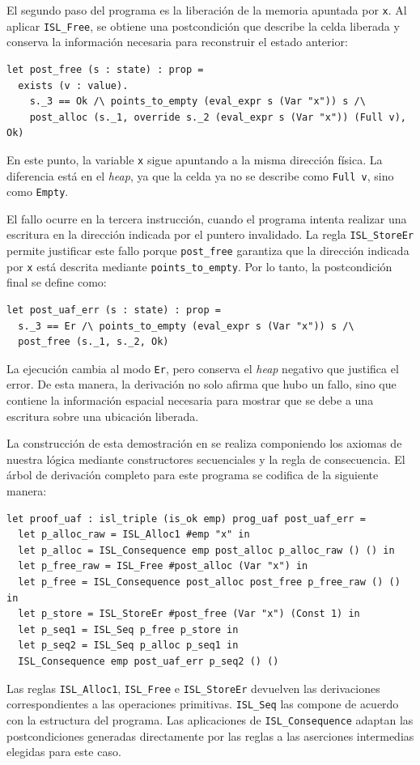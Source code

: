\documentclass[a4paper,	11pt]{report}
\newif\ifdraft\drafttrue
\newcommand{\comm}[3]{\ifdraft{{\color{#1}[#2: #3]}}\fi}
\newcommand{\guido}[1]{\comm{blue}{Guido}{#1}}
\begin{document}
El segundo paso del programa es la liberación de la memoria apuntada por \lstinline|x|.
Al aplicar \lstinline|ISL_Free|,
se obtiene una postcondición que describe la celda liberada y conserva la información necesaria para reconstruir el estado anterior:

\begin{lstlisting}
let post_free (s : state) : prop =
  exists (v : value).
    s._3 == Ok /\ points_to_empty (eval_expr s (Var "x")) s /\
    post_alloc (s._1, override s._2 (eval_expr s (Var "x")) (Full v), Ok)
\end{lstlisting}
En este punto,
la variable \lstinline|x| sigue apuntando a la misma dirección física.
La diferencia está en el \emph{heap}, ya que la celda ya no se describe como \lstinline|Full v|, sino como \lstinline|Empty|.

El fallo ocurre en la tercera instrucción,
cuando el programa intenta realizar una escritura en la dirección indicada por el puntero invalidado.
La regla \lstinline|ISL_StoreEr| permite justificar este fallo porque \lstinline|post_free| garantiza
que la dirección indicada por \lstinline|x| está descrita mediante \lstinline|points_to_empty|.
Por lo tanto,
la postcondición final se define como:

\begin{lstlisting}
let post_uaf_err (s : state) : prop =
  s._3 == Er /\ points_to_empty (eval_expr s (Var "x")) s /\
  post_free (s._1, s._2, Ok)
\end{lstlisting}
La ejecución cambia al modo \lstinline|Er|,
pero conserva el \emph{heap} negativo que justifica el error.
De esta manera,
la derivación no solo afirma que hubo un fallo,
sino que contiene la información espacial necesaria para mostrar que se debe a una escritura sobre una ubicación liberada.

La construcción de esta demostración en \fstar{} se realiza componiendo los axiomas de nuestra lógica
mediante constructores secuenciales y la regla de consecuencia.
El árbol de derivación completo para este programa se codifica de la siguiente manera:

\begin{lstlisting}
let proof_uaf : isl_triple (is_ok emp) prog_uaf post_uaf_err =
  let p_alloc_raw = ISL_Alloc1 #emp "x" in
  let p_alloc = ISL_Consequence emp post_alloc p_alloc_raw () () in
  let p_free_raw = ISL_Free #post_alloc (Var "x") in
  let p_free = ISL_Consequence post_alloc post_free p_free_raw () () in
  let p_store = ISL_StoreEr #post_free (Var "x") (Const 1) in
  let p_seq1 = ISL_Seq p_free p_store in
  let p_seq2 = ISL_Seq p_alloc p_seq1 in
  ISL_Consequence emp post_uaf_err p_seq2 () ()
\end{lstlisting}
Las reglas \lstinline|ISL_Alloc1|,
\lstinline|ISL_Free| e \lstinline|ISL_StoreEr| devuelven las derivaciones correspondientes a las operaciones primitivas.
\lstinline|ISL_Seq| las compone de acuerdo con la estructura del programa.
Las aplicaciones de \lstinline|ISL_Consequence| adaptan las postcondiciones generadas directamente por las reglas
a las aserciones intermedias elegidas para este caso.
\end{document}
